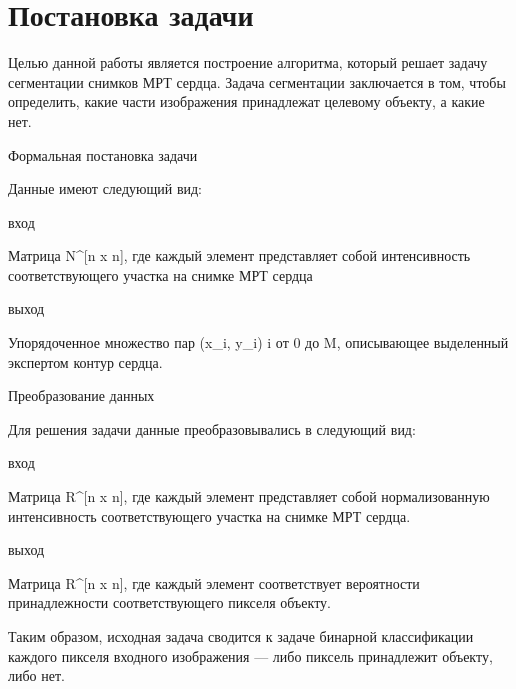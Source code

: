 \section{Постановка задачи}

Целью данной работы является построение алгоритма, который решает задачу сегментации снимков МРТ сердца. Задача сегментации заключается в том, чтобы определить, какие части изображения принадлежат целевому объекту, а какие нет. 

Формальная постановка задачи

Данные имеют следующий вид:

вход 

Матрица N^[n x n], где каждый элемент представляет собой интенсивность соответствующего участка на снимке МРТ сердца

выход

Упорядоченное множество пар (x_i, y_i) i от 0 до M, описывающее выделенный экспертом контур сердца.

Преобразование данных

Для решения задачи данные преобразовывались в следующий вид:

вход

Матрица R^[n x n], где каждый элемент представляет собой нормализованную интенсивность соответствующего участка на снимке МРТ сердца.

выход

Матрица R^[n x n], где каждый элемент соответствует вероятности принадлежности соответствующего пикселя объекту. 

Таким образом, исходная задача сводится к задаче бинарной классификации каждого пикселя входного изображения — либо пиксель принадлежит объекту, либо нет.
